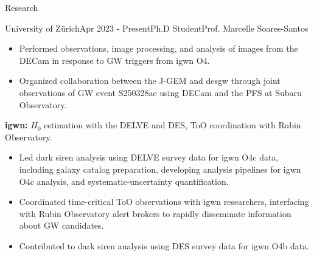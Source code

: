 \documentclass{resume} %
\begin{document}
\begin{rSection}{Research}
\begin{rSubsection}{University of Zürich}{Apr 2023 - Present}{Ph.D Student}{Prof. Marcelle Soares-Santos}
\begin{itemize}
         \item Performed observations, image processing, and analysis of images from the \ac{DECam} in response to \ac{GW} triggers from \ac{igwn} \ac{O4}. 
         \item Organized collaboration between the \ac{J-GEM} and \ac{desgw} through joint observations of \ac{GW} event S250328ae using \ac{DECam} and the \ac{PFS} at Subaru Observatory.
     \end{itemize}
     \item \textbf{\ac{igwn}:} $H_0$ estimation with the \ac{DELVE} and \ac{DES}, \ac{ToO} coordination with Rubin Observatory.
     \begin{itemize}
         \item Led dark siren analysis using \ac{DELVE} survey data for \ac{igwn} O4c data, including galaxy catalog preparation, developing analysis pipelines for \ac{igwn} O4c analysis, and systematic-uncertainty quantification.
         \item Coordinated time-critical \ac{ToO} observations with \ac{igwn} researchers, interfacing with Rubin Observatory alert brokers to rapidly disseminate information about \ac{GW} candidates.
         \item Contributed to dark siren analysis using \ac{DES} survey data for \ac{igwn} O4b data.
     \end{itemize}  
     
   

\end{rSubsection}
\end{rSection}
\end{document}
